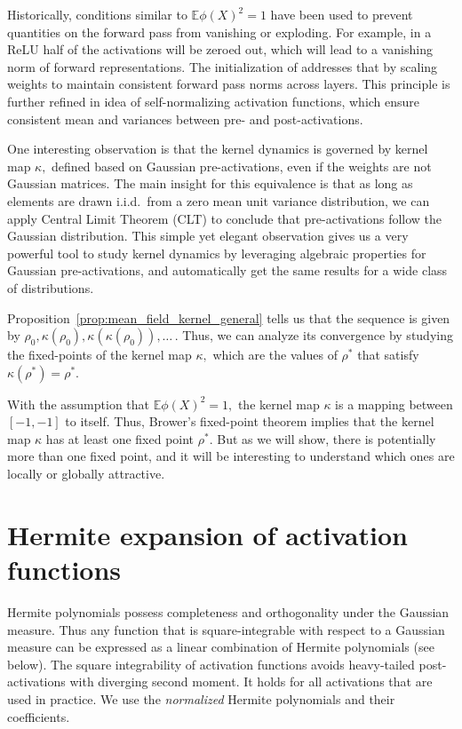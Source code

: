 \documentclass[twoside]{article}
\newcommand{\E}{\mathbb{E}}
\theoremstyle{definition}
\newcommand{\thomas}[1]{{\color{blue}TH:  \textit{#1}}}
\begin{document}

Historically, conditions similar to $\E \phi(X)^2=1$ have been used to prevent quantities on the forward pass from vanishing or exploding. For example, in a ReLU  half of the activations will be zeroed out, which will lead to a vanishing norm of forward representations. The initialization  of
\citep{he2016deep} addresses that by scaling weights to maintain consistent forward pass norms across layers. This principle is further refined in \citep{klambauer2017self} idea of self-normalizing activation functions, which ensure consistent mean and variances between pre- and post-activations. 

One interesting observation is that the kernel dynamics is governed by kernel map $\kappa,$ defined based on Gaussian pre-activations, even if the weights are not Gaussian matrices. The main insight for this equivalence is that as long as elements are drawn i.i.d.~from a zero mean unit variance distribution, we can apply Central Limit Theorem (CLT) to conclude that pre-activations follow the Gaussian distribution. This simple yet elegant observation gives us a very powerful tool to study kernel dynamics by leveraging algebraic properties for Gaussian pre-activations, and automatically get the same results for a wide class of distributions. 

Proposition~\ref{prop:mean_field_kernel_general} tells us that the sequence is given by $\rho_0,\kappa(\rho_0),\kappa(\kappa(\rho_0)),\dots\,.$ Thus, we can analyze its convergence by studying the fixed-points of the kernel map $\kappa,$
which are the values of $\rho^*$ that satisfy $\kappa(\rho^*) = \rho^*.$ 

With the assumption that $\E \phi(X)^2=1,$ the kernel map $\kappa$ is a mapping between $[-1,-1]$ to itself. Thus, Brower's fixed-point theorem implies that the kernel map $\kappa$ has at least one fixed point $\rho^*.$ But as we will show, there is potentially more than one fixed point, and it will be interesting to understand which ones are locally or globally attractive. 


\section{Hermite expansion of activation functions}
Hermite polynomials possess completeness and orthogonality under the Gaussian measure. Thus any function that is square-integrable with respect to a Gaussian measure can be expressed as a linear combination of Hermite polynomials (see below). The square integrability of activation functions avoids heavy-tailed post-activations with diverging second moment. It holds for all activations that are used in practice. We use the \emph{normalized} Hermite polynomials and their coefficients. 
\end{document}
